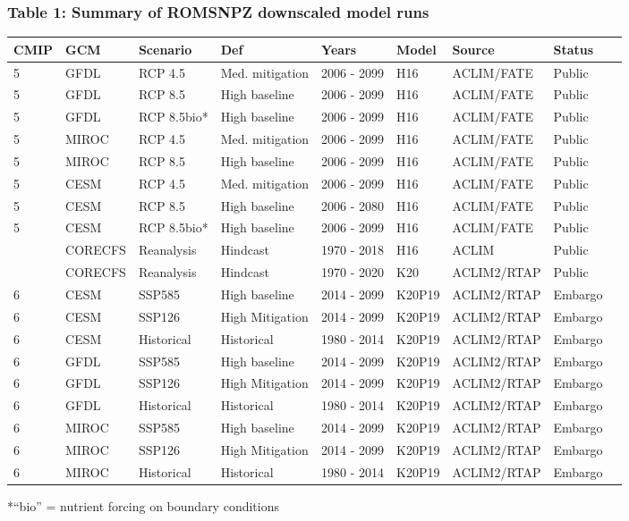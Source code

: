 \documentclass[
]{article}
\begin{document}
\hypertarget{table-1-summary-of-romsnpz-downscaled-model-runs}{%
\subsubsection{Table 1: Summary of ROMSNPZ downscaled model
runs}\label{table-1-summary-of-romsnpz-downscaled-model-runs}}

\begin{longtable}[]{@{}lllllllll@{}}
\toprule
CMIP & GCM & Scenario & Def & Years & Model & Source & Status
&\tabularnewline
\midrule
\endhead
5 & GFDL & RCP 4.5 & Med. mitigation & 2006 - 2099 & H16 & ACLIM/FATE &
Public &\tabularnewline
5 & GFDL & RCP 8.5 & High baseline & 2006 - 2099 & H16 & ACLIM/FATE &
Public &\tabularnewline
5 & GFDL & RCP 8.5bio* & High baseline & 2006 - 2099 & H16 & ACLIM/FATE
& Public &\tabularnewline
5 & MIROC & RCP 4.5 & Med. mitigation & 2006 - 2099 & H16 & ACLIM/FATE &
Public &\tabularnewline
5 & MIROC & RCP 8.5 & High baseline & 2006 - 2099 & H16 & ACLIM/FATE &
Public &\tabularnewline
5 & CESM & RCP 4.5 & Med. mitigation & 2006 - 2099 & H16 & ACLIM/FATE &
Public &\tabularnewline
5 & CESM & RCP 8.5 & High baseline & 2006 - 2080 & H16 & ACLIM/FATE &
Public &\tabularnewline
5 & CESM & RCP 8.5bio* & High baseline & 2006 - 2099 & H16 & ACLIM/FATE
& Public &\tabularnewline
& CORECFS & Reanalysis & Hindcast & 1970 - 2018 & H16 & ACLIM & Public
&\tabularnewline
& CORECFS & Reanalysis & Hindcast & 1970 - 2020 & K20 & ACLIM2/RTAP &
Public &\tabularnewline
6 & CESM & SSP585 & High baseline & 2014 - 2099 & K20P19 & ACLIM2/RTAP &
Embargo &\tabularnewline
6 & CESM & SSP126 & High Mitigation & 2014 - 2099 & K20P19 & ACLIM2/RTAP
& Embargo &\tabularnewline
6 & CESM & Historical & Historical & 1980 - 2014 & K20P19 & ACLIM2/RTAP
& Embargo &\tabularnewline
6 & GFDL & SSP585 & High baseline & 2014 - 2099 & K20P19 & ACLIM2/RTAP &
Embargo &\tabularnewline
6 & GFDL & SSP126 & High Mitigation & 2014 - 2099 & K20P19 & ACLIM2/RTAP
& Embargo &\tabularnewline
6 & GFDL & Historical & Historical & 1980 - 2014 & K20P19 & ACLIM2/RTAP
& Embargo &\tabularnewline
6 & MIROC & SSP585 & High baseline & 2014 - 2099 & K20P19 & ACLIM2/RTAP
& Embargo &\tabularnewline
6 & MIROC & SSP126 & High Mitigation & 2014 - 2099 & K20P19 &
ACLIM2/RTAP & Embargo &\tabularnewline
6 & MIROC & Historical & Historical & 1980 - 2014 & K20P19 & ACLIM2/RTAP
& Embargo &\tabularnewline
\bottomrule
\end{longtable}

*``bio'' = nutrient forcing on boundary conditions
\end{document}
